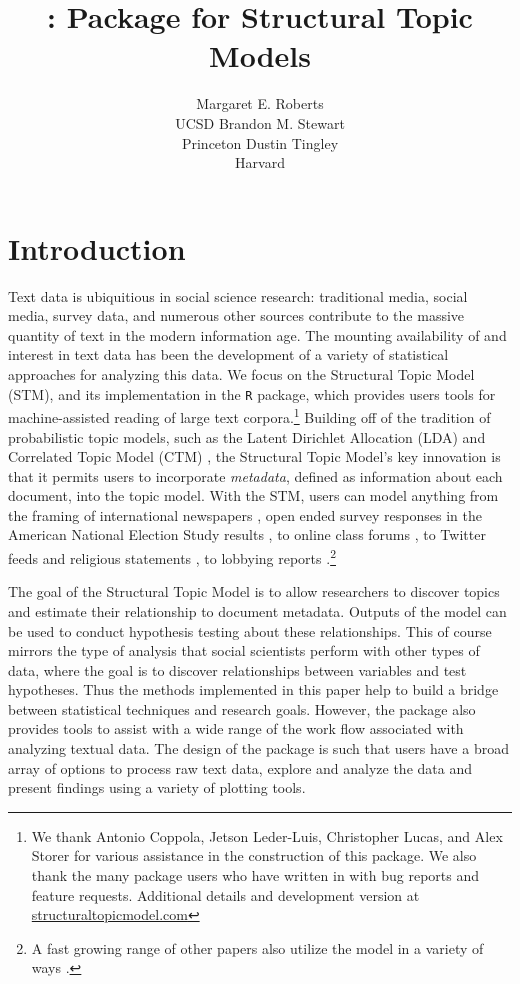 \documentclass[article,shortnames]{jss}
\author{\hspace{1.1in}Margaret E. Roberts\\\hspace{1.1in}UCSD \And
  \hspace{1.5in}Brandon M. Stewart\\\hspace{1.5in}Princeton \And
  \hspace{1.5in}Dustin Tingley\\\hspace{1.5in}Harvard \And
}
\title{\pkg{stm}: \proglang{R} Package for Structural Topic Models}
\newcommand\spacingset[1]{\renewcommand{\baselinestretch}{#1}\small\normalsize}
\begin{document}

\spacingset{1}

\section{Introduction}

Text data is ubiquitious in social science research: traditional media, social media, survey data, and numerous other sources contribute to the massive quantity of text in the modern information age. The mounting availability of and interest in text data has been the development of a variety of statistical approaches for analyzing this data. We focus on the Structural Topic Model (STM), and its implementation in the  \texttt{R} package,  which provides users tools for machine-assisted reading of large text corpora.\footnote{We thank Antonio Coppola, Jetson Leder-Luis, Christopher Lucas, and Alex Storer for various assistance in the construction of this package.  We also thank the many package users who have written in with bug reports and feature requests. Additional details and development version at \url{structuraltopicmodel.com}}  Building off of the tradition of probabilistic topic models, such as the Latent Dirichlet Allocation (LDA) \citep{blei2003latent} and Correlated Topic Model (CTM) \citep{blei2007correlated}, the Structural Topic Model's key innovation is that it permits users to incorporate \emph{metadata}, defined as information about each document, into the topic model. With the STM, users can model anything from the framing of international newspapers \citep{stmjasa}, open ended survey responses in the American National Election Study results \citep{ajps}, to online class forums \citep{StudentText}, to Twitter feeds and religious statements \citep{TextComparative}, to lobbying reports \citep{sailing}.\footnote{A fast growing range of other papers also utilize the model in a variety of ways \citep{wang2015time,goodman2015creating,fearfriction,constituent,chuangcomputer,TvinnereimClimate}.}


The goal of the Structural Topic Model is to allow researchers to discover topics and estimate their relationship to document metadata. Outputs of the model can be used to conduct hypothesis testing about these relationships. This of course mirrors the type of analysis that social scientists perform with other types of data, where the goal is to discover relationships between variables and test hypotheses. Thus the methods implemented in this paper help to build a bridge between statistical techniques and research goals. However, the  package also provides tools to assist with a wide range of the work flow associated with analyzing textual data. The design of the package is such that users have a broad array of options to process raw text data, explore and analyze the data and present findings using a variety of plotting tools.
\end{document}
